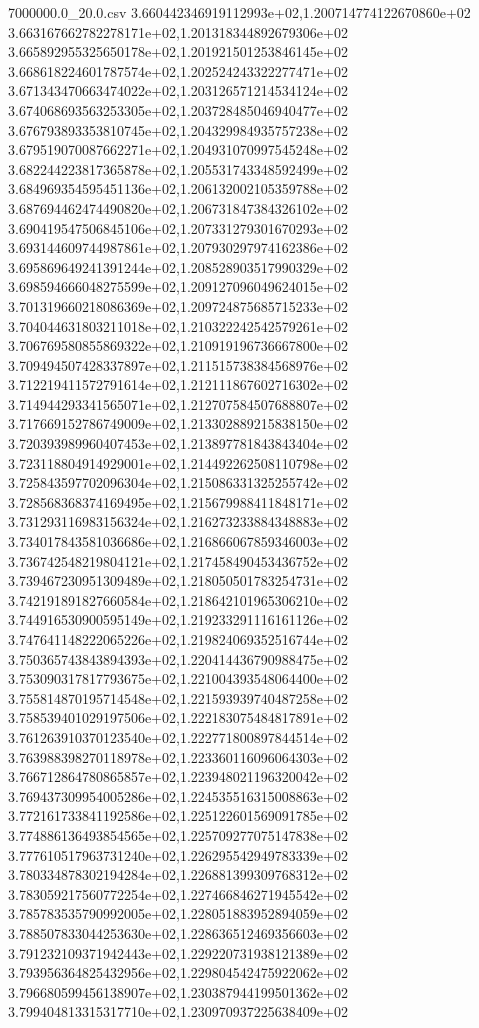\begin{filecontents*}{7000000.0_20.0.csv}
3.660442346919112993e+02,1.200714774122670860e+02
3.663167662782278171e+02,1.201318344892679306e+02
3.665892955325650178e+02,1.201921501253846145e+02
3.668618224601787574e+02,1.202524243322277471e+02
3.671343470663474022e+02,1.203126571214534124e+02
3.674068693563253305e+02,1.203728485046940477e+02
3.676793893353810745e+02,1.204329984935757238e+02
3.679519070087662271e+02,1.204931070997545248e+02
3.682244223817365878e+02,1.205531743348592499e+02
3.684969354595451136e+02,1.206132002105359788e+02
3.687694462474490820e+02,1.206731847384326102e+02
3.690419547506845106e+02,1.207331279301670293e+02
3.693144609744987861e+02,1.207930297974162386e+02
3.695869649241391244e+02,1.208528903517990329e+02
3.698594666048275599e+02,1.209127096049624015e+02
3.701319660218086369e+02,1.209724875685715233e+02
3.704044631803211018e+02,1.210322242542579261e+02
3.706769580855869322e+02,1.210919196736667800e+02
3.709494507428337897e+02,1.211515738384568976e+02
3.712219411572791614e+02,1.212111867602716302e+02
3.714944293341565071e+02,1.212707584507688807e+02
3.717669152786749009e+02,1.213302889215838150e+02
3.720393989960407453e+02,1.213897781843843404e+02
3.723118804914929001e+02,1.214492262508110798e+02
3.725843597702096304e+02,1.215086331325255742e+02
3.728568368374169495e+02,1.215679988411848171e+02
3.731293116983156324e+02,1.216273233884348883e+02
3.734017843581036686e+02,1.216866067859346003e+02
3.736742548219804121e+02,1.217458490453436752e+02
3.739467230951309489e+02,1.218050501783254731e+02
3.742191891827660584e+02,1.218642101965306210e+02
3.744916530900595149e+02,1.219233291116161126e+02
3.747641148222065226e+02,1.219824069352516744e+02
3.750365743843894393e+02,1.220414436790988475e+02
3.753090317817793675e+02,1.221004393548064400e+02
3.755814870195714548e+02,1.221593939740487258e+02
3.758539401029197506e+02,1.222183075484817891e+02
3.761263910370123540e+02,1.222771800897844514e+02
3.763988398270118978e+02,1.223360116096064303e+02
3.766712864780865857e+02,1.223948021196320042e+02
3.769437309954005286e+02,1.224535516315008863e+02
3.772161733841192586e+02,1.225122601569091785e+02
3.774886136493854565e+02,1.225709277075147838e+02
3.777610517963731240e+02,1.226295542949783339e+02
3.780334878302194284e+02,1.226881399309768312e+02
3.783059217560772254e+02,1.227466846271945542e+02
3.785783535790992005e+02,1.228051883952894059e+02
3.788507833044253630e+02,1.228636512469356603e+02
3.791232109371942443e+02,1.229220731938121389e+02
3.793956364825432956e+02,1.229804542475922062e+02
3.796680599456138907e+02,1.230387944199501362e+02
3.799404813315317710e+02,1.230970937225638409e+02

\end{filecontents*}

